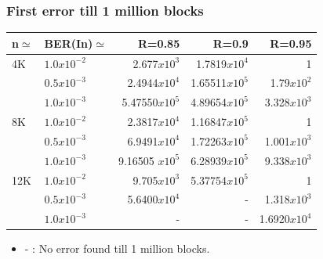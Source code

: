 \documentclass[xcolor=dvipsname]
{beamer}
\begin{document}
\begin{frame}[t] 
\frametitle{First error till 1 million blocks}

\begin{table}[]
\centering
\begin{tabular}{|l|l|r|r|r|}
\hline
n$\simeq$   & BER(In)$\simeq$  & R=0.85  & R=0.9 & R=0.95 \\ \hline
4K  & $1.0x10^{-2}$    &2.677$x10^{3}$           &1.7819$x10^{4}$       &1       \\ 
    & $0.5x10^{-3}$    &2.4944$x10^{4}$          &1.65511$x10^{5}$		&1.79$x10^{2}$   \\ 
    & $1.0x10^{-3}$    &5.47550$x10^{5}$         &4.89654$x10^{5}$     &3.328$x10^{3}$ \\ \hline
8K  & $1.0x10^{-2}$    &2.3817$x10^{4}$          &1.16847$x10^{5}$        &1   \\ 
    & $0.5x10^{-3}$    &6.9491$x10^{4}$          &1.72263$x10^{5}$        &1.001$x10^{3}$  \\ 
    & $1.0x10^{-3}$    &9.16505 $x10^{5}$        &6.28939$x10^{5}$       &9.338$x10^{3}$           \\ \hline
12K & $1.0x10^{-2}$    &9.705$x10^{3}$          &5.37754$x10^{5}$       	&1       \\
    & $0.5x10^{-3}$    &5.6400$x10^{4}$          &-     			 		&1.318$x10^{3}$             \\ 
    & $1.0x10^{-3}$    &- 			             &-    					 &1.6920$x10^{4}$   \\ \hline 
\end{tabular}
\end{table}
\begin{itemize}
\item -	 : No error found till 1 million blocks. 
\end{itemize}
\end{frame}
\end{document}
